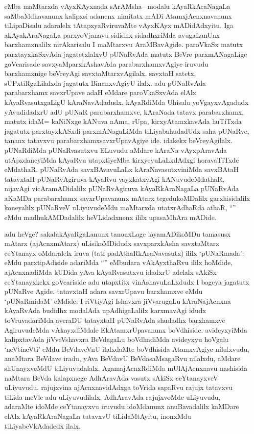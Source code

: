 \begin{artha}
eMba maMtarxda vAyxKAyxnada sArAMsha-- modalu kAyaRkAraNagaLa saMbaMdhavanunx kalipxsi adanenx nimitatx mADi AtamxjAcnxnavanunx tiLipaDisalu adaralelx tAtapxyaRviruvaMte vAyxKAyx mADidAdxyitu. Iga akAyakAraNagaLa parxyoVjanavu sididhx sidadhxriMda avugaLanUnx barxhamxnalilx nirAkarisalu I maMtarxvu AraMBavAgide. paroVkaSx matutx parxtayxkaSxvAda jagatetxlalxvU pUNaRvAda matutx BeVre parxmANagaLige goVcarisade savxyaMparxkAshavAda parabarxhamxvAgiye iruvudu barxhamxnige beVreyAgi savxtaMtarxvAgilalx. savxtaH satetx, sUPxtiRgaLilalxda jagatutx BinanxvAgiyU ilalx. adu pUNaRvAda parabarxhamx savxrUpave adaH eMdare paroVkaSxvAda elAlx kAyaRvasutxgaLigU kAraNavAdadudx, kAyaRdiMda Uhisalu yoVgayxvAgadudx yAvudidadxrU adU pUNaR parabarxhamxve, kAraNada tatavx parabarxhamx, matutx idaM= kaNiNxge kANuva nAma, rUpa, kirxyAtamxkavAda huTiTxda jagatutx parxtayxkASxdi parxmANagaLiMda tiLiyabahudadUdx saha pUNaRve, tananx tatavxvu parabarxhamxsavxrUpavAgiye ide. idakekx beVreyAgilalx. pUNaRdiMda pUNaRvasutxvu ELuvudu aMdare kAraNa vAyxpAravAda utApxdaneyiMda kAyaRvu utapxtiyeMba kirxyeyuLaLxdAdxgi horavaTiTxde eMdathaR. pUNaRvAda savxBAvavuLaLx kAraNavasutxviniMda savxBAtaH tatavxtaH pUNaRvAgiruva kAyaRvu vayxkatxvAgi kANuvudeMdathaR, nijavAgi vicAramADidalilx pUNaRvAgiruva kAyaRkAraNagaLa pUNaRvAda aKaMDa parabarxhamx savxrUpavanunx mAtarx tegedukoMDalilx garxhisidalilx koneyalilx pUNaRveV uLiyuvudeMdu maMtarxda utatxrAdhaRda athaR, ``\stext'' eMdu madhukAMDadalilx heVLidadxnenx ililx upasaMhAra mADide.
\end{artha}

\begin{artha}
adu heVge? sakalakAyaRgaLanunx tanonxLage layamADikoMDu tamasusx mAtarx (ajAcnxmAtarx) uLisikoMDidudx savxparxkAsha savxtaMtarx ceYtanayx oMdaralelx iruva (tatf padAthaRkAraNavasutx) ililx `pUNaRmada': eMdu parxtipAdiside adariMda ``\stext'' eMbudara vAkAyxthaRvu ililx hoMdide, ajAcnxnadiMda kUDida yAva kAyaRvasutxvu idadxrU adelalx sAkiSx ceYtanayxkekx goVcariside adu utapxtitx vinAshavuLaLxdudx I bageya jagatutx pUNaRve Agide. tatavxtaH adara savxrUpavu barxhamxve eMdu `pUNaRmidaM' eMdide. I riVtiyAgi Ishavxra jiVvarugaLu kAraNajAcnxna kAyaRvAda budidhx modalAda upAdhigaLalilx karxmavAgi idudx toVruvadariMda averaDU tatavxtaH pUNaRvAda shudadhx barxhamxve AgiruvudeMda vAkayxdiMdale EkAtamxrUpavanunx boVdhiside. avideyxyiMda kalipxtavAda jiVveVshavxra BeVdagaLu boVdhadiMda avideyxyu hoVgalu `neVtineVti' eMdu BeVdaveVnU ilalxdaMte boVdhisida AtamxvAgiye nilulxvudu, anaMtara BeVdave iradu, yAva BeVdavU BeVdasaMsagaRvu nilalxdu, aMdare shUnayxveMdU tiLiyuvudalalx, AgamajAcnxRdiMda mUlAjAcnxnavu nashisida naMtara BeVda kalapxnege AdhAravAda vasutx sAkiSx ceYtanayxveV uLiyuvudu. rajujxvina ajAcnxnavidAdxga toVrida sapaRvu rajujx tatavxvu tiLida meVle adu uLiyuvudilalx, AdhAravAda rajujxvoMde uLiyuvudu, adaraMte idoMde ceYtanayxvu iruvudu idoMdanunx anuBavadalilx kaMDare elAlx kAyaRkAraNagaLa tatavxvU tiLidaMtAyitu, inonxMdu tiLiyabeVkAdadedx ilalx. 
\end{artha}

